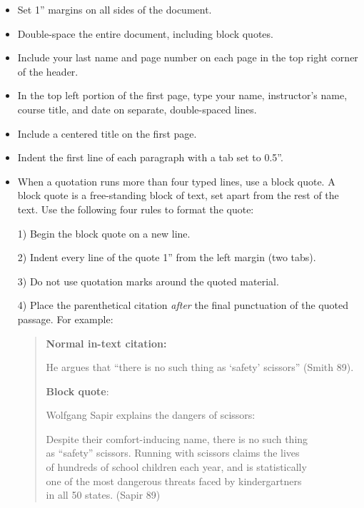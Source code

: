 \documentclass[12pt, hidelinks]{article} %
\newcommand{\tab}{\hspace*{2em}}
\begin{document}
\begin{itemize}
\item Set 1'' margins on all sides of the document.
\item Double-space the entire document, including block quotes.
\item Include your last name and page number on each page in the top right corner of the header.
\item In the top left portion of the first page, type your name, instructor's name, course title, and date on separate, double-spaced lines.
\item Include a centered title on the first page.
\item Indent the first line of each paragraph with a tab set to 0.5''.
\item When a quotation runs more than four typed lines, use a block quote. A block quote is a free-standing block of text, set apart from the rest of the text. Use the following four rules to format the quote: 

1) Begin the block quote on a new line. 

2) Indent every line of the quote 1'' from the left margin (two tabs). 

3) Do not use quotation marks around the quoted material. 

4) Place the parenthetical citation \emph{after} the final punctuation of the quoted passage. For example:

\begin{quote}
\textbf{Normal in-text citation:}

He argues that ``there is no such thing as `safety' scissors'' (Smith 89).

\textbf{Block quote}: 


Wolfgang Sapir explains the dangers of scissors:
\begin{doublespace}

\tab \tab Despite their comfort-inducing name, there is no such thing \\ \tab \tab as ``safety'' scissors. Running with scissors claims the lives \\ \tab \tab of hundreds of school children each year, and is statistically \\ \tab \tab one of the most dangerous threats faced by kindergartners \\ \tab\tab in all 50 states. (Sapir 89)

\end{doublespace}
\end{quote}

\end{itemize}
\end{document}
